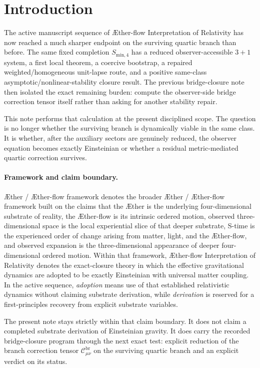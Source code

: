\documentclass[11pt]{article}
\newcommand{\Aether}{\AE{}ther}
\newcommand{\Aflow}{\AE{}ther-flow}
\newcommand{\TheoryName}{\Aflow{} Interpretation of Relativity}
\newcommand{\TheoryProgram}{\Aether{} / \Aflow{} framework}
\begin{document}
\section{Introduction}

The active manuscript sequence of \TheoryName{} has now reached a much sharper endpoint on the surviving quartic branch than before. The same fixed completion \(S_{\mathrm{min},4}\) has a reduced observer-accessible \(3+1\) system, a first local theorem, a coercive bootstrap, a repaired weighted/homogeneous unit-lapse route, and a positive same-class asymptotic/nonlinear-stability closure result. The previous bridge-closure note then isolated the exact remaining burden: compute the observer-side bridge correction tensor itself rather than asking for another stability repair.

This note performs that calculation at the present disciplined scope. The question is no longer whether the surviving branch is dynamically viable in the same class. It is whether, after the auxiliary sectors are genuinely reduced, the observer equation becomes exactly Einsteinian or whether a residual metric-mediated quartic correction survives.

\paragraph{Framework and claim boundary.}
\TheoryProgram{} denotes the broader \Aether{} / \Aflow{} framework built on the claims that the \Aether{} is the underlying four-dimensional substrate of reality, the \Aflow{} is its intrinsic ordered motion, observed three-dimensional space is the local experiential slice of that deeper substrate, S-time is the experienced order of change arising from matter, light, and the \Aflow{}, and observed expansion is the three-dimensional appearance of deeper four-dimensional ordered motion. Within that framework, \TheoryName{} denotes the exact-closure theory in which the effective gravitational dynamics are adopted to be exactly Einsteinian with universal matter coupling. In the active sequence, \emph{adoption} means use of that established relativistic dynamics without claiming substrate derivation, while \emph{derivation} is reserved for a first-principles recovery from explicit substrate variables.

The present note stays strictly within that claim boundary. It does not claim a completed substrate derivation of Einsteinian gravity. It does carry the recorded bridge-closure program through the next exact test: explicit reduction of the branch correction tensor \(\mathcal C_{\mu\nu}^{\mathrm{br}}\) on the surviving quartic branch and an explicit verdict on its status.
\end{document}
